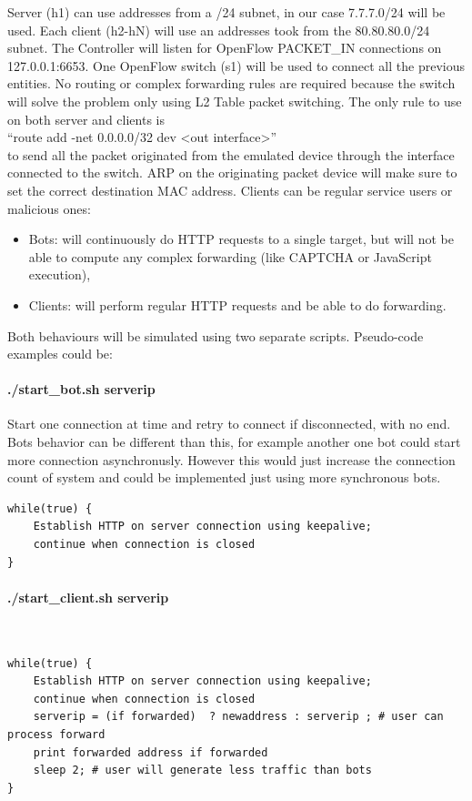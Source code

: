 Server (h1) can use addresses from a /24 subnet, in our case 7.7.7.0/24 will be used.
Each client (h2-hN) will use an addresses took from the 80.80.80.0/24 subnet.
The Controller will listen for OpenFlow PACKET\_IN connections on 127.0.0.1:6653.
One OpenFlow switch (s1) will be used to connect all the previous entities. No routing or complex forwarding rules are required because the switch will solve the problem only using L2 Table packet switching. The only rule to use on both server and clients is \\
“route add -net 0.0.0.0/32 dev <out interface>”
\\
to send all the packet originated from the emulated device through the interface connected to the switch. ARP on the originating packet device will make sure to set the correct destination MAC address.
Clients can be regular service users or malicious ones:
\begin{itemize}
	\item Bots: will continuously do HTTP requests to a single target, but will not be able to compute any complex forwarding (like CAPTCHA or JavaScript execution),
	\item Clients: will perform regular HTTP requests and be able to do forwarding.
\end{itemize}	
Both behaviours will be simulated using two separate scripts. Pseudo-code examples could be:
\paragraph{./start\_bot.sh serverip}
Start one connection at time and retry to connect if disconnected, with no end. Bots behavior can be different than this, for example another one bot could start more connection asynchronusly.  However this would just increase the connection count of system and could be implemented just using more synchronous bots.
\begin{lstlisting}[caption={./start\_bot.sh pseudo code},captionpos=b]
while(true) {
	Establish HTTP on server connection using keepalive;
	continue when connection is closed
}
\end{lstlisting}

\paragraph{./start\_client.sh serverip}\
\begin{lstlisting}[caption={./start\_client.sh pseudo code},captionpos=b]
while(true) {
	Establish HTTP on server connection using keepalive;
	continue when connection is closed
	serverip = (if forwarded)  ? newaddress : serverip ; # user can process forward
	print forwarded address if forwarded
	sleep 2; # user will generate less traffic than bots
}

\end{lstlisting}

